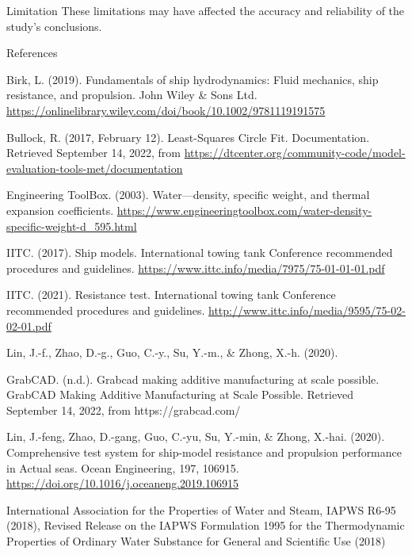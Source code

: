 \documentclass[final, 20pt]{beamer}
\newlength{\colwidth}
\begin{document}
\begin{frame}[t]
\begin{columns}[t]
\begin{column}{\colwidth}
\begin{block}{Limitation}
        These limitations may have affected the accuracy and reliability of the study's conclusions.
      \end{block}

      \vfill

      \begin{block}{References}
        \tiny
        \begin{multicols}{2}

          \begin{hangparas}{0.5in}{1}
            Birk, L. (2019). Fundamentals of ship hydrodynamics: Fluid mechanics, ship resistance, and propulsion. John Wiley \& Sons Ltd. \url{https://onlinelibrary.wiley.com/doi/book/10.1002/9781119191575}

            Bullock, R. (2017, February 12). Least-Squares Circle Fit. Documentation. Retrieved September 14, 2022, from \url{https://dtcenter.org/community-code/model-evaluation-tools-met/documentation}

            Engineering ToolBox. (2003). Water---density, specific weight, and thermal expansion coeﬀicients. \url{https://www.engineeringtoolbox.com/water-density-specific-weight-d_595.html}

            IITC. (2017). Ship models. International towing tank Conference recommended procedures and guidelines. \url{https://www.ittc.info/media/7975/75-01-01-01.pdf}

            IITC. (2021). Resistance test. International towing tank Conference recommended procedures and guidelines. \url{http://www.ittc.info/media/9595/75-02-02-01.pdf}

            Lin, J.-f., Zhao, D.-g., Guo, C.-y., Su, Y.-m., \& Zhong, X.-h. (2020).

            GrabCAD. (n.d.). Grabcad making additive manufacturing at scale possible. GrabCAD Making Additive Manufacturing at Scale Possible. Retrieved September 14, 2022, from https://grabcad.com/

            Lin, J.-feng, Zhao, D.-gang, Guo, C.-yu, Su, Y.-min, \& Zhong, X.-hai. (2020). Comprehensive test system for ship-model resistance and propulsion performance in Actual seas. Ocean Engineering, 197, 106915. \url{https://doi.org/10.1016/j.oceaneng.2019.106915}

            International Association for the Properties of Water and Steam, IAPWS R6-95 (2018), Revised Release on the IAPWS Formulation 1995 for the Thermodynamic Properties of Ordinary Water Substance for General and Scientific Use (2018)
          \end{hangparas}
        \end{multicols}

      \end{block}
    \end{column}

    \margincolumn
  \end{columns}

\end{frame}
\end{document}
